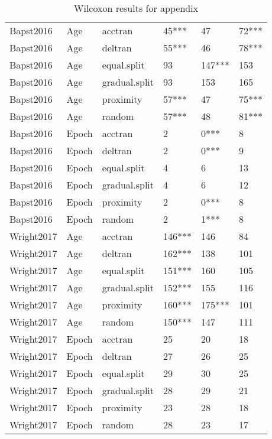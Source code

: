 \begin{table}[ht]
\begin{tabular}{llllll}
  Bapst2016 & Age & acctran & 45*** & 47 & 72*** \\ 
  Bapst2016 & Age & deltran & 55*** & 46 & 78*** \\ 
  Bapst2016 & Age & equal.split & 93 & 147*** & 153 \\ 
  Bapst2016 & Age & gradual.split & 93 & 153 & 165 \\ 
  Bapst2016 & Age & proximity & 57*** & 47 & 75*** \\ 
  Bapst2016 & Age & random & 57*** & 48 & 81*** \\ 
  Bapst2016 & Epoch & acctran & 2 & 0*** & 8 \\ 
  Bapst2016 & Epoch & deltran & 2 & 0*** & 9 \\ 
  Bapst2016 & Epoch & equal.split & 4 & 6 & 13 \\ 
  Bapst2016 & Epoch & gradual.split & 4 & 6 & 12 \\ 
  Bapst2016 & Epoch & proximity & 2 & 0*** & 8 \\ 
  Bapst2016 & Epoch & random & 2 & 1*** & 8 \\ 
  Wright2017 & Age & acctran & 146*** & 146 & 84 \\ 
  Wright2017 & Age & deltran & 162*** & 138 & 101 \\ 
  Wright2017 & Age & equal.split & 151*** & 160 & 105 \\ 
  Wright2017 & Age & gradual.split & 152*** & 155 & 116 \\ 
  Wright2017 & Age & proximity & 160*** & 175*** & 101 \\ 
  Wright2017 & Age & random & 150*** & 147 & 111 \\ 
  Wright2017 & Epoch & acctran & 25 & 20 & 18 \\ 
  Wright2017 & Epoch & deltran & 27 & 26 & 25 \\ 
  Wright2017 & Epoch & equal.split & 29 & 30 & 25 \\ 
  Wright2017 & Epoch & gradual.split & 28 & 29 & 21 \\ 
  Wright2017 & Epoch & proximity & 23 & 28 & 18 \\ 
  Wright2017 & Epoch & random & 28 & 23 & 17 \\ 
   \hline
\end{tabular}
\caption{Wilcoxon results for appendix} 
\end{table}
